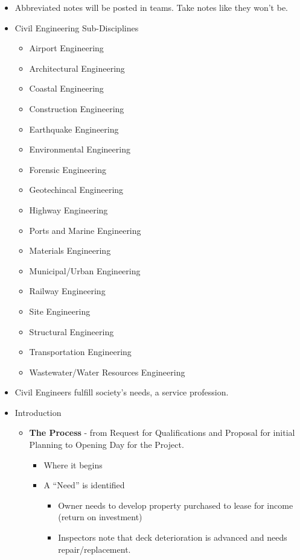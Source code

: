 \documentclass{article}
\begin{document}
\begin{itemize}
    \item Abbreviated notes will be posted in teams. Take notes like they won't be.
    \item Civil Engineering Sub-Disciplines
    \begin{itemize}
        \item Airport Engineering
        \item Architectural Engineering
        \item Coastal Engineering
        \item Construction Engineering
        \item Earthquake Engineering
        \item Environmental Engineering
        \item Forensic Engineering
        \item Geotechincal Engineering
        \item Highway Engineering
        \item Ports and Marine Engineering
        \item Materials Engineering
        \item Municipal/Urban Engineering
        \item Railway Engineering
        \item Site Engineering
        \item Structural Engineering
        \item Transportation Engineering
        \item Wastewater/Water Resources Engineering
    \end{itemize}
    \item Civil Engineers fulfill society's needs, a service profession.
    \item Introduction
    \begin{itemize}
        \item \textbf{The Process} - from Request for Qualifications and Proposal for initial Planning to Opening Day for the Project.
        \begin{itemize}
            \item Where it begins
            \item A ``Need'' is identified
            \begin{itemize}
                \item Owner needs to develop property purchased to lease for income (return on investment)
                \item Inspectors note that deck deterioration is advanced and needs repair/replacement.

\end{itemize}
\end{itemize}
\end{itemize}
\end{itemize}
\end{document}
